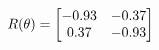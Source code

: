 \documentclass[preview]{standalone}
\begin{document}
\begin{align*}
\special{dvisvgm:raw <g id='unique000'>}R(\theta) = \begin{bmatrix}-0.93 & -0.37\\0.37 & -0.93\end{bmatrix}\special{dvisvgm:raw </g>}
\end{align*}
\end{document}
